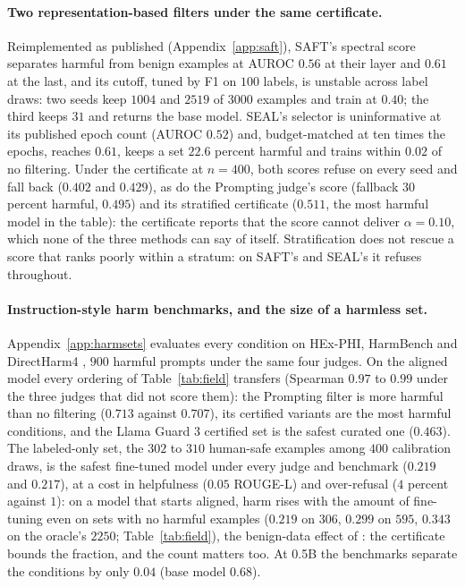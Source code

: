 \documentclass{article} %
\begin{document}
\paragraph{Two representation-based filters under the same certificate.} Reimplemented as published (Appendix~\ref{app:saft}), SAFT's spectral score separates harmful from benign examples at AUROC $0.56$ at their layer and $0.61$ at the last, and its cutoff, tuned by F1 on $100$ labels, is unstable across label draws: two seeds keep $1004$ and $2519$ of $3000$ examples and train at $0.40$; the third keeps $31$ and returns the base model. SEAL's selector is uninformative at its published epoch count (AUROC $0.52$) and, budget-matched at ten times the epochs, reaches $0.61$, keeps a set $22.6$ percent harmful and trains within $0.02$ of no filtering. Under the certificate at $n = 400$, both scores refuse on every seed and fall back ($0.402$ and $0.429$), as do the Prompting judge's score (fallback $30$ percent harmful, $0.495$) and its stratified certificate ($0.511$, the most harmful model in the table): the certificate reports that the score cannot deliver $\alpha = 0.10$, which none of the three methods can say of itself. Stratification does not rescue a score that ranks poorly within a stratum: on SAFT's and SEAL's it refuses throughout.

\paragraph{Instruction-style harm benchmarks, and the size of a harmless set.} Appendix~\ref{app:harmsets} evaluates every condition on HEx-PHI, HarmBench and DirectHarm4 \citep{qi2024finetuning, mazeika2024harmbench, lyu2024directharm}, $900$ harmful prompts under the same four judges. On the aligned model every ordering of Table~\ref{tab:field} transfers (Spearman $0.97$ to $0.99$ under the three judges that did not score them): the Prompting filter is more harmful than no filtering ($0.713$ against $0.707$), its certified variants are the most harmful conditions, and the Llama Guard 3 certified set is the safest curated one ($0.463$). The labeled-only set, the $302$ to $310$ human-safe examples among $400$ calibration draws, is the safest fine-tuned model under every judge and benchmark ($0.219$ and $0.217$), at a cost in helpfulness ($0.05$ ROUGE-L) and over-refusal ($4$ percent against $1$): on a model that starts aligned, harm rises with the amount of fine-tuning even on sets with no harmful examples ($0.219$ on $306$, $0.299$ on $595$, $0.343$ on the oracle's $2250$; Table~\ref{tab:field}), the benign-data effect of \citet{qi2024finetuning}: the certificate bounds the fraction, and the count matters too. At 0.5B the benchmarks separate the conditions by only $0.04$ (base model $0.68$).
\end{document}
